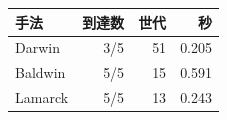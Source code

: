 \begin{tabular}{lrrr}\hline
手法 & 到達数 & 世代 & 秒\\\hline
Darwin & 3/5 & 51 & 0.205\\
Baldwin & 5/5 & 15 & 0.591\\
Lamarck & 5/5 & 13 & 0.243\\
\hline\end{tabular}
